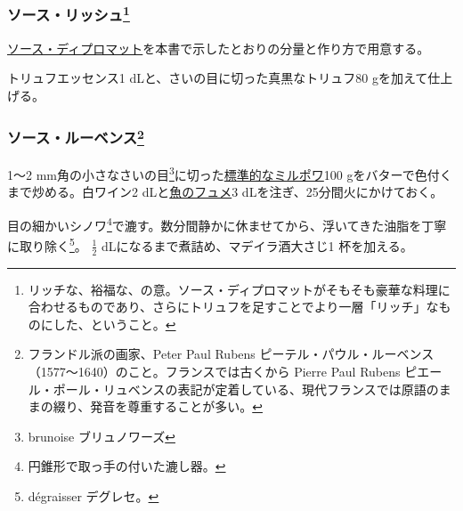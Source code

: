 \begin{recette}
\hypertarget{sauce-riche}{%
\subsubsection[ソース・リッシュ]{\texorpdfstring{ソース・リッシュ\footnote{リッチな、裕福な、の意。ソース・ディプロマットがそもそも豪華な料理に合わせるものであり、さらにトリュフを足すことでより一層「リッチ」なものにした、ということ。}}{ソース・リッシュ}}\label{sauce-riche}}


 

\protect\hyperlink{sauce-diplomate}{ソース・ディプロマット}を本書で示したとおりの分量と作り方で用意する。

トリュフエッセンス1 dLと、さいの目に切った真黒なトリュフ80
gを加えて仕上げる。

\hypertarget{sauce-rubens}{%
\subsubsection[ソース・ルーベンス]{\texorpdfstring{ソース・ルーベンス\footnote{フランドル派の画家、Peter
  Paul Rubens
  ピーテル・パウル・ルーベンス（1577〜1640）のこと。フランスでは古くから
  Pierre Paul Rubens
  ピエール・ポール・リュベンスの表記が定着している、現代フランスでは原語のままの綴り、発音を尊重することが多い。}}{ソース・ルーベンス}}\label{sauce-rubens}}



1〜2 mm角の小さなさいの目\footnote{brunoise ブリュノワーズ}に切った\protect\hyperlink{}{標準的なミルポワ}100
gをバターで色付くまで炒める。白ワイン2
dLと\protect\hyperlink{fumet-de-poisson}{魚のフュメ}3
dLを注ぎ、25分間火にかけておく。

目の細かいシノワ\footnote{円錐形で取っ手の付いた漉し器。}で漉す。数分間静かに休ませてから、浮いてきた油脂を丁寧に取り除く\footnote{dégraisser
  デグレセ。}。 \(\frac{1}{2}\) dLになるまで煮詰め、マデイラ酒大さじ1
杯を加える。


\end{recette}
